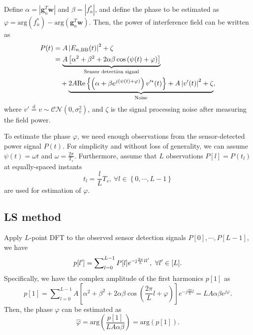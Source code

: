 \documentclass[12pt,draftclsnofoot,journal,onecolumn]{IEEEtran}
\theoremstyle{nonumberplain}
\def \arg {\text{arg}}
\begin{document}
    Define $\alpha = \left\vert\bm g_{n}^{T}\bm w\right\vert$ and $\beta = \left\vert f_{n}^{*}\right \vert$, and define the phase to be estimated as $\varphi = \arg\left(f_{n}^{*}\right)-\arg\left(\bm g_{n}^{T}\bm w\right)$. Then, the power of interference field can be written as
    \begin{equation}
        \label{Power of Interference}
        \begin{aligned}
            P(t)&=A \left| E_{n, {\rm BB}} (t)\right |^{2}+\zeta\\
            &=\underbrace{A\left[\alpha^{2}+\beta^{2}+2\alpha\beta\cos\left(\psi(t)+\varphi\right)\right]}_{\text{Sensor detection signal}}\\
            &~~~+\underbrace{2A\text{Re}\left\{\left(\alpha+\beta e^{j\left(\psi(t)+\varphi\right)}\right)v'^{*}(t)\right\}+A\left|v'(t)\right|^{2}+\zeta}_{\text{Noise}},\\
        \end{aligned}
    \end{equation}
    where $v'\overset{\text{d}}{=}v\sim\mathcal{CN}\left(0,\sigma_{v}^{2}\right)$, and $\zeta$ is the signal processing noise after measuring the field power. 

    To estimate the phase $\varphi$, we need enough observations from the sensor-detected power signal $P(t)$. For simplicity and without loss of generality, we can assume $\psi(t)=\omega t$ and $\omega=\frac{2\pi}{T_{s}}$. Furthermore, assume that $L$ observations $P[l]=P(t_{l})$ at equally-spaced instants 
    \begin{equation}
        \label{observation time}
        t_{l}=\frac{l}{L}T_{s},~\forall l\in \left\{0,\cdots ,L-1\right\}
    \end{equation}
    are used for estimation of $\varphi$.

\subsection{LS method}
    Apply $L$-point \ac{DFT} to the observed sensor detection signals $P[0],\cdots ,P[L-1]$, we have
    \begin{equation}
        \label{DFT}
        p[l']=\sum\nolimits_{l=0}^{L-1}P[l]e^{-{\rm j}\frac{2\pi}{L}ll'},~\forall l'\in [L].
    \end{equation}
    Specifically, we have the complex amplitude of the first harmonics $p[1]$ as 
    \begin{equation}
        \label{DFT l=1}
        p[1]=\sum\nolimits_{l=0}^{L-1}A\left[\alpha^{2}+\beta^{2}+2\alpha\beta\cos\left(\frac{2\pi}{L}l+\varphi\right)\right]e^{-j\frac{2\pi}{L}l}=LA\alpha\beta  e^{j\varphi}.
    \end{equation}
    Then, the phase $\varphi$ can be estimated as
    \begin{equation}
        \label{LS estimate result}
        \hat{\varphi}=\arg\left(\frac{p[1]}{LA\alpha\beta}\right) = \arg\left(p[1]\right).
    \end{equation}
\end{document}
